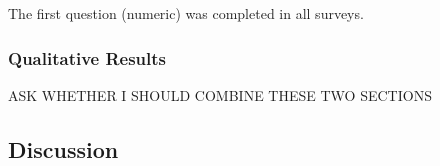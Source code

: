 	The first question (numeric) was completed in all surveys. 












\subsubsection{Qualitative Results}

	ASK WHETHER I SHOULD COMBINE THESE TWO SECTIONS







\subsection{Discussion}


